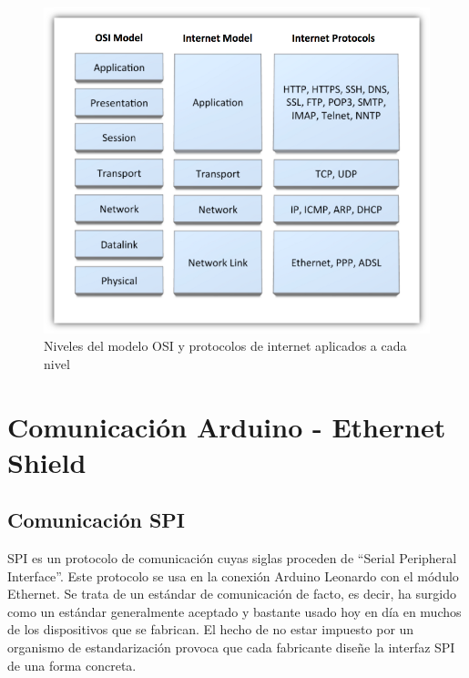 \begin{figure}
\centering
\includegraphics[scale = 0.65]{capitulo_02/figuras_dir/OSI.jpg}
\caption{Niveles del modelo OSI y protocolos de internet aplicados a cada nivel}
\end{figure}









\section{Comunicación Arduino - Ethernet Shield} %

\subsection{Comunicación SPI} %

SPI es un protocolo de comunicación cuyas siglas proceden de ``Serial Peripheral Interface''. Este protocolo se usa en la conexión Arduino Leonardo con el módulo Ethernet. Se trata de un estándar de comunicación de facto, es decir, ha surgido como un estándar generalmente aceptado y bastante usado hoy en día en muchos de los dispositivos que se fabrican. El hecho de no estar impuesto por un organismo de estandarización provoca que cada fabricante diseñe la interfaz SPI de una forma concreta.

